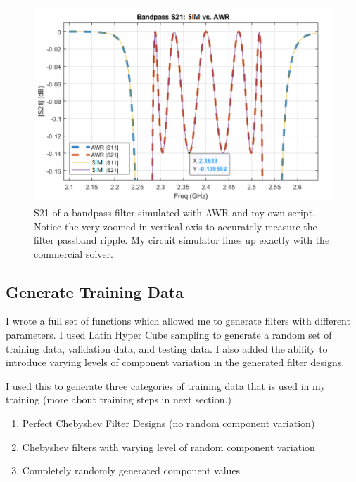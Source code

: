 \documentclass[10pt,conference]{IEEEtran}
\begin{document}
\begin{figure}
	\centering
	\includegraphics[width=0.9\linewidth]{Figures/MATLAB_vs_AWR_2.png}
	\caption{S21 of a bandpass filter simulated with AWR and my own script. Notice the very zoomed in vertical axis to accurately measure the filter passband ripple. My circuit simulator lines up exactly with the commercial solver.}
	\label{MATLAB_vs_AWR_2}
\end{figure}











\subsection{Generate Training Data}

I wrote a full set of functions which allowed me to generate filters with different parameters. I used Latin Hyper Cube sampling to generate a random set of training data, validation data, and testing data. I also added the ability to introduce varying levels of component variation in the generated filter designs.

I used this to generate three categories of training data that is used in my training (more about training steps in next section.)
\begin{enumerate}[label=\arabic*)]
    \item Perfect Chebyshev Filter Designs (no random component variation)
    \item Chebyshev filters with varying level of random component variation
    \item Completely randomly generated component values
\end{enumerate}
\end{document}
